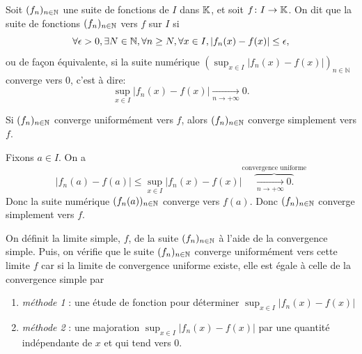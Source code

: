 \documentclass{book}
\newcommand{\fn}{(f_n)_{n\in \N   }}
\begin{document}
\begin{Definition}[Convergence uniforme $\fn$]
Soit $\fn$ une suite de fonctions de $I$ dans $\mathbb{K}  $, et soit $f \colon I \to\mathbb{K}  $.
On dit que la suite de fonctions $\fn$  vers $f$ sur $I$ si 
\[ \forall  \epsilon>0 , \exists N\in \mathbb{N} , \forall  n\geq N ,\forall  x\in I, \left|f_n(x) - f(x)\right| \leq  \epsilon, \]
ou de façon équivalente, si la suite numérique $(\sup_{x\in I} \left|f_n(x) - f(x)\right|)_{n\in\mathbb{N}}$ converge vers 0, c'est à dire:
\[  \sup_{x\in I} \left|f_n(x) - f(x)\right|   \xrightarrow[n\to+\infty ]{}0.  \]
\end{Definition}

\begin{Proposition}
Si $\fn$ converge uniformément vers $f$, alors $\fn$ converge simplement vers $f$.
\end{Proposition}
\begin{Demonstration}
Fixons $a\in I$. On a$$ \left|f_n(a) - f(a)\right|\leq   \sup_{x\in I} \left|f_n(x) - f(x)\right|  \overbrace{\xrightarrow[n\to+\infty ]{}0.}^{\text{convergence uniforme}}$$
Donc la suite numérique $(f_n(a))_{n\in\mathbb{N}}$ converge vers $f(a)$. Donc  $\fn$ converge simplement vers $f$.
\end{Demonstration}
\begin{Methode}
On définit la limite simple, $f$, de la suite $\fn$ à l'aide de la convergence simple. Puis, on vérifie que le suite  $\fn$ converge uniformément vers cette limite $f$ car si la limite de convergence uniforme existe, elle est égale à celle de la convergence simple par 
\begin{enumerate}
\item\textit{ méthode 1} : une étude de fonction pour déterminer $\sup_{x\in I}\left|f_n(x) - f(x)\right|$
\item\textit{ méthode 2} :  une majoration $\sup_{x\in I}\left|f_n(x) - f(x)\right|$ par une quantité indépendante de $x$ et qui tend vers 0.
\end{enumerate}
\end{Methode}
\end{document}
